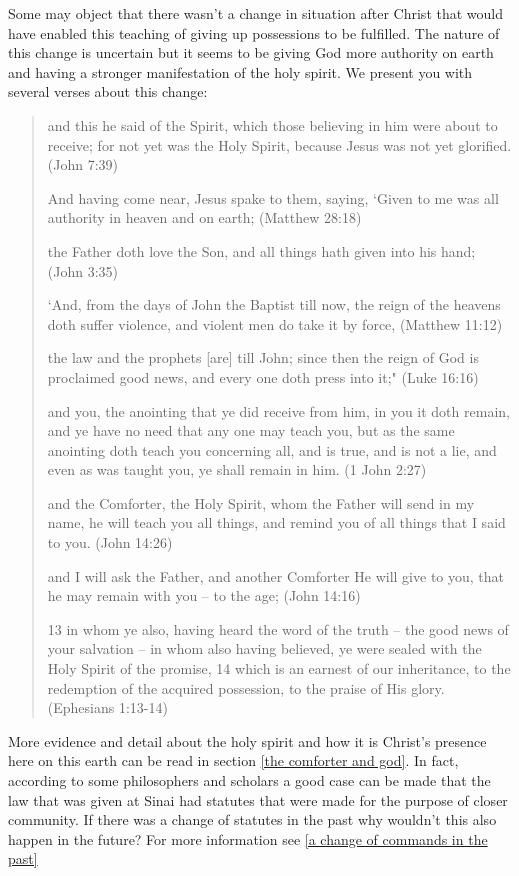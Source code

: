 \documentclass[11pt]{article}
\begin{document}
Some may object that there wasn't a change in situation after Christ that would have enabled this teaching of giving up possessions to be fulfilled. The nature of this change is uncertain but it seems to be giving God more authority on earth and having a stronger manifestation of the holy spirit. We present you with several verses about this change:
\begin{quote}
and this he said of the Spirit, which those believing in him were about to receive; for not yet was the Holy Spirit, because Jesus was not yet glorified. (John 7:39)

And having come near, Jesus spake to them, saying, `Given to me was all authority in heaven and on earth; (Matthew 28:18)

the Father doth love the Son, and all things hath given into his hand; (John 3:35)

`And, from the days of John the Baptist till now, the reign of the heavens doth suffer violence, and violent men do take it by force, (Matthew 11:12)

the law and the prophets [are] till John; since then the reign of God is proclaimed good news, and every one doth press into it;" (Luke 16:16)

and you, the anointing that ye did receive from him, in you it doth remain, and ye have no need that any one may teach you, but as the same anointing doth teach you concerning all, and is true, and is not a lie, and even as was taught you, ye shall remain in him. (1 John 2:27)

and the Comforter, the Holy Spirit, whom the Father will send in my name, he will teach you all things, and remind you of all things that I said to you. (John 14:26)

and I will ask the Father, and another Comforter He will give to you, that he may remain with you -- to the age;
(John 14:16)

13 in whom ye also, having heard the word of the truth -- the good news of your salvation -- in whom also having believed, ye were sealed with the Holy Spirit of the promise,
14 which is an earnest of our inheritance, to the redemption of the acquired possession, to the praise of His glory. (Ephesians 1:13-14)
\end{quote}
More evidence and detail about the holy spirit and how it is Christ's presence here on this earth can be read in section \ref{the comforter and god}. In fact, according to some philosophers and scholars a good case can be made that the law that was given at Sinai had statutes that were made for the purpose of closer community. If there was a change of statutes in the past why wouldn't this also happen in the future? For more information see \ref{a change of commands in the past}
\end{document}
